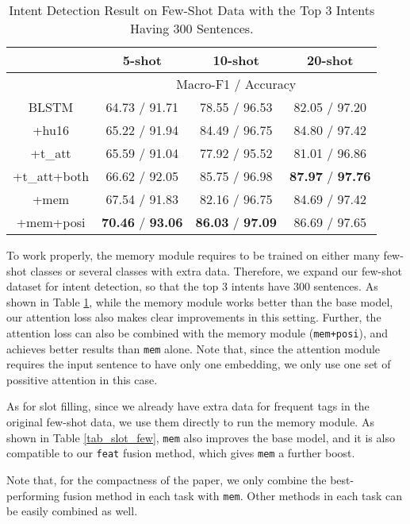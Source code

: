 \begin{table}
\setlength{\tabcolsep}{0.23em}
\centering
\small{
\begin{tabular}{|c|c|c|c|}

\hline
  & \multicolumn{1}{|c|}{5-shot} & \multicolumn{1}{|c|}{10-shot} & \multicolumn{1}{|c|}{20-shot}  \\
 \hline
  & \multicolumn{3}{|c|}{Macro-F1 / Accuracy}   \\
\hline
BLSTM & 64.73 / 91.71 & 78.55 / 96.53 & 82.05 / 97.20 \\
\hline
+hu16 & 65.22 / 91.94 & 84.49 / 96.75 & 84.80 / 97.42 \\
\hline
+t\_att & 65.59 / 91.04 & 77.92 / 95.52 & 81.01 / 96.86 \\
\hline
+t\_att+both & 66.62 / 92.05 & 85.75 / 96.98 & \textbf{87.97} / \textbf{97.76} \\
\hline
+mem & 67.54 / 91.83 & 82.16 / 96.75 & 84.69 / 97.42 \\
\hline
+mem+posi & \textbf{70.46} / \textbf{93.06} & \textbf{86.03} / \textbf{97.09} & 86.69 / 97.65 \\
\hline

\end{tabular}
}
\caption{Intent Detection Result on Few-Shot Data with the Top 3 Intents Having 300 Sentences.}
\label{tab_intent_few_fill}
\end{table}

To work properly, the memory module requires to be trained on either many few-shot classes or several classes with extra data.
Therefore, we expand our few-shot dataset for intent detection, so that the top 3 intents have 300 sentences. 
As shown in Table \ref{tab_intent_few_fill}, while the memory module works better than the base model, our attention loss also makes clear improvements in this setting. 
Further, the attention loss can also be combined with the memory module (\texttt{mem+posi}), and achieves better results than \texttt{mem} alone. 
Note that, since the attention module requires the input sentence to have only one embedding, we only use one set of possitive attention in this case.

As for slot filling, since we already have extra data for frequent tags in the original few-shot data, we use them directly to run the memory module. As shown in Table \ref{tab_slot_few}, \texttt{mem} also improves the base model, and it is also compatible to our \texttt{feat} fusion method, which gives \texttt{mem} a further boost.

Note that, for the compactness of the paper, we only combine the best-performing fusion method in each task with \texttt{mem}. Other methods in each task can be easily combined as well. 

